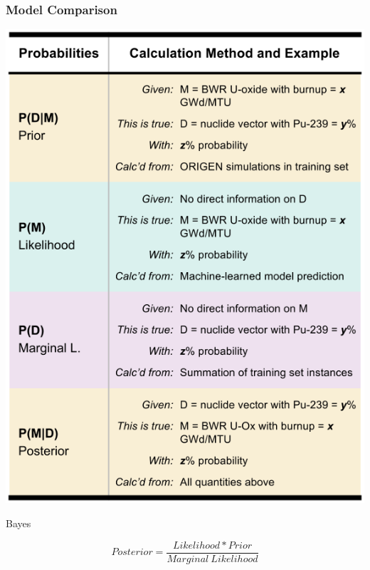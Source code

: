 \begin{frame}
  \frametitle{Model Comparison}
  \begin{minipage}{0.5\textwidth}
    \centering
    \begin{table}[h!]
      \centering
      \includegraphics[height=0.7\textheight]{./figures/bayes.png}
      \caption{Bayes}
    \end{table}
  \end{minipage}%
  \begin{minipage}{0.5\textwidth}
    \centering
    \begin{equation}
      Posterior = \frac{Likelihood * Prior}{Marginal \ Likelihood} 
    \end{equation}
  \end{minipage}
\end{frame}

